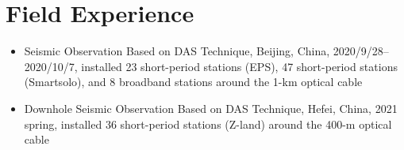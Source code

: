 \section{Field Experience}

\begin{itemize}
\item 
    Seismic Observation Based on DAS Technique, Beijing, China,
    2020/9/28--2020/10/7, installed 23 short-period stations (EPS), 47 short-period stations (Smartsolo), and 8 broadband stations around the 1-km optical cable
\item 
    Downhole Seismic Observation Based on DAS Technique, Hefei, China,
    2021 spring, installed 36 short-period stations (Z-land) around the 400-m optical cable
\end{itemize}





